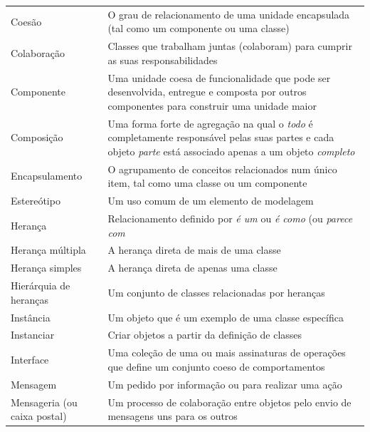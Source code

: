 \documentclass[
	article,			%
	12pt,				%
	openright,
	twoside,			%
	a4paper,			%
	english,			%
	french,
	brazil,				%
	sumario=tradicional
	]{abntex2}
\begin{document}
\begin{longtable}[l]{p{4.6cm}p{11.1cm}}
Coesão & O grau de relacionamento de uma unidade encapsulada (tal como um componente ou uma classe)\\

Colaboração & Classes que trabalham juntas (colaboram) para cumprir as suas responsabilidades\\

Componente & Uma unidade coesa de funcionalidade que pode ser desenvolvida, entregue e composta por outros componentes para construir uma unidade maior\\

Composição & Uma forma forte de agregação na qual o \emph{todo} é completamente responsável pelas suas partes e cada objeto \emph{parte} está associado apenas a um objeto \emph{completo}\\

Encapsulamento & O agrupamento de conceitos relacionados num único item, tal como uma classe ou um componente\\

Estereótipo & Um uso comum de um elemento de modelagem\\

Herança & Relacionamento definido por \emph{é um} ou \emph{é como} (ou \emph{parece com}\\

Herança múltipla & A herança direta de mais de uma classe\\

Herança simples & A herança direta de apenas uma classe\\

Hierárquia de heranças & Um conjunto de classes relacionadas por heranças\\

Instância & Um objeto que é um exemplo de uma classe específica\\

Instanciar & Criar objetos a partir da definição de classes\\

Interface & Uma coleção de uma ou mais assinaturas de operações que define um conjunto coeso de comportamentos\\

Mensagem & Um pedido por informação ou para realizar uma ação\\

Mensageria (ou caixa postal) & Um processo de colaboração entre objetos pelo envio de mensagens uns para os outros\\


\end{longtable}
\end{document}
